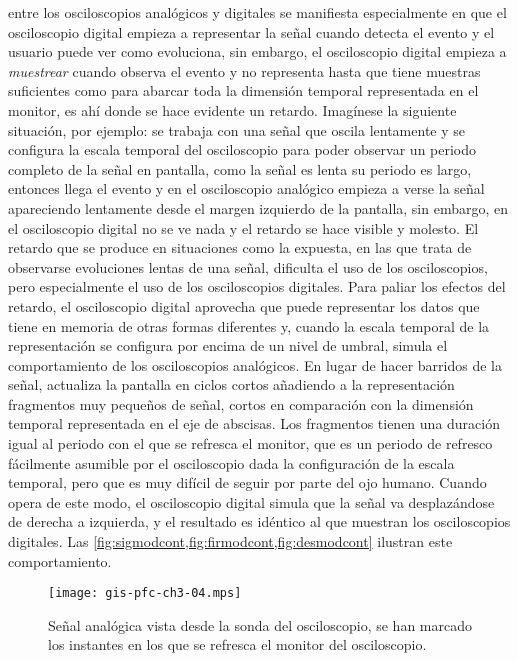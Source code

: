 entre los osciloscopios analógicos y digitales se manifiesta especialmente
en que el osciloscopio digital empieza a representar la señal cuando
detecta el evento y el usuario puede ver como evoluciona, sin embargo, el
osciloscopio digital empieza a \emph{muestrear} cuando observa el evento y
no representa hasta que tiene muestras suficientes como para abarcar toda
la dimensión temporal representada en el monitor, es ahí donde se hace
evidente un retardo. Imagínese la siguiente situación, por ejemplo: se
trabaja con una señal que oscila lentamente y se configura la escala
temporal del osciloscopio para poder observar un periodo completo de la
señal en pantalla, como la señal es lenta su periodo es largo, entonces
llega el evento y en el osciloscopio analógico empieza a verse la señal
apareciendo lentamente desde el margen izquierdo de la pantalla, sin
embargo, en el osciloscopio digital no se ve nada y el retardo se hace
visible y molesto. El retardo que se produce en situaciones como la
expuesta, en las que trata de observarse evoluciones lentas de una señal,
dificulta el uso de los osciloscopios, pero especialmente el uso de los
osciloscopios digitales.  Para paliar los efectos del retardo, el
osciloscopio digital aprovecha que puede representar los datos que tiene en
memoria de otras formas diferentes y, cuando la escala temporal de la
representación se configura por encima de un nivel de umbral, simula el
comportamiento de los osciloscopios analógicos. En lugar de hacer barridos
de la señal, actualiza la pantalla en ciclos cortos añadiendo a la
representación fragmentos muy pequeños de señal, cortos en comparación con
la dimensión temporal representada en el eje de abscisas. Los fragmentos
tienen una duración igual al periodo con el que se refresca el monitor, que
es un periodo de refresco fácilmente asumible por el osciloscopio dada la
configuración de la escala temporal, pero que es muy difícil de seguir por
parte del ojo humano. Cuando opera de este modo, el osciloscopio digital
simula que la señal va desplazándose de derecha a izquierda, y el resultado
es idéntico al que muestran los osciloscopios digitales. Las
\vref{fig:sigmodcont,fig:firmodcont,fig:desmodcont} ilustran este
comportamiento.

\begin{figure}
	\begin{center}
		\texttt{[image: gis-pfc-ch3-04.mps]}
	\end{center}
	\caption[Señal analógica, representación continua]{Señal analógica
	vista desde la sonda del osciloscopio, se han marcado los instantes
	en los que se refresca el monitor del osciloscopio.}
	\label{fig:sigmodcont}
\end{figure}

